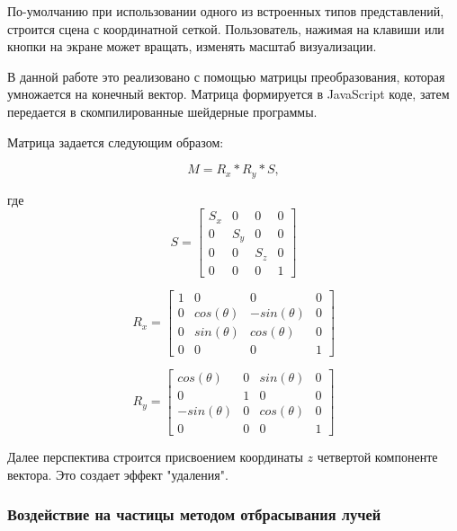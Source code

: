 По-умолчанию при использовании одного из встроенных типов представлений,
строится сцена с координатной сеткой. Пользователь, нажимая на клавиши
или кнопки на экране может вращать, изменять масштаб визуализации.

В данной работе это реализовано с помощью матрицы преобразования,
которая умножается на конечный вектор. Матрица формируется в JavaScript 
коде, затем передается в скомпилированные шейдерные программы.

Матрица задается следующим образом:

\begin{equation}
\label{eq:}
  M = R_x * R_y * S,
\end{equation}

где \\

\begin{equation}
\label{eq:}
  S = 
  \begin{bmatrix}
    S_x & 0 & 0 & 0 \\
    0  & S_y & 0 & 0 \\
    0  & 0 & S_z & 0 \\
    0 & 0 & 0 & 1
  \end{bmatrix}
\end{equation}

\begin{equation}
\label{eq:}
R_x = 
\begin{bmatrix}
  1 & 0 & 0 & 0 \\
  0 & cos(\theta) & -sin(\theta) & 0 \\
  0 & sin(\theta) & cos(\theta) & 0 \\
  0 & 0 & 0 & 1
\end{bmatrix}
\end{equation}

\begin{equation}
\label{eq:}
R_y = 
\begin{bmatrix}
  cos(\theta) & 0 & sin(\theta) & 0 \\
  0 & 1 & 0 & 0 \\
  -sin(\theta) & 0 & cos(\theta) & 0 \\
  0 & 0 & 0 & 1
\end{bmatrix}
\end{equation}

Далее перспектива строится присвоением координаты $z$ четвертой компоненте
вектора. Это создает эффект "удаления".

\subsubsection{Воздействие на частицы методом отбрасывания лучей}

